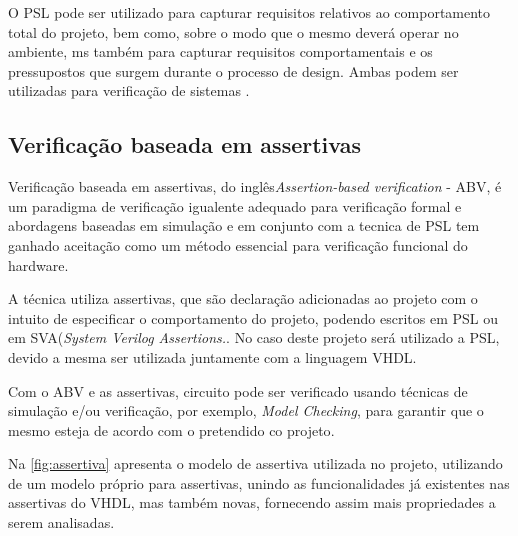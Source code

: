 \par
O PSL pode ser utilizado para capturar requisitos relativos ao comportamento total do projeto, bem como, sobre o modo que o mesmo deverá operar no ambiente, ms também para capturar requisitos comportamentais e os pressupostos que surgem durante o processo de design. Ambas podem ser utilizadas para verificação de sistemas \cite{IEEEPSL}.
\subsection{Verificação baseada em assertivas}
Verificação baseada em assertivas, do inglês\textit{Assertion-based verification} - ABV, é um paradigma de verificação igualente adequado para verificação formal e abordagens baseadas em simulação\cite{boule2005incorporating} e em conjunto com a tecnica de PSL tem ganhado aceitação como um método essencial para verificação funcional do hardware\cite{DahanCombining}.

\par
A técnica utiliza assertivas, que são declaração adicionadas ao projeto com o intuito de especificar o comportamento do projeto, podendo escritos em PSL ou em SVA(\textit{System Verilog Assertions.}\cite{boule2005incorporating}. No caso deste projeto será utilizado a PSL, devido a mesma ser utilizada juntamente com a linguagem VHDL.

\par
Com o ABV e as assertivas, circuito pode ser verificado usando técnicas de simulação e/ou verificação, por exemplo, \textit{Model Checking}, para garantir que o mesmo esteja de acordo com o pretendido co projeto\cite{DahanCombining}. 

Na \autoref{fig:assertiva} apresenta o modelo de assertiva utilizada no projeto, utilizando de um modelo próprio para assertivas, unindo as funcionalidades já existentes nas assertivas do VHDL, mas também novas, fornecendo assim mais propriedades a serem analisadas.

